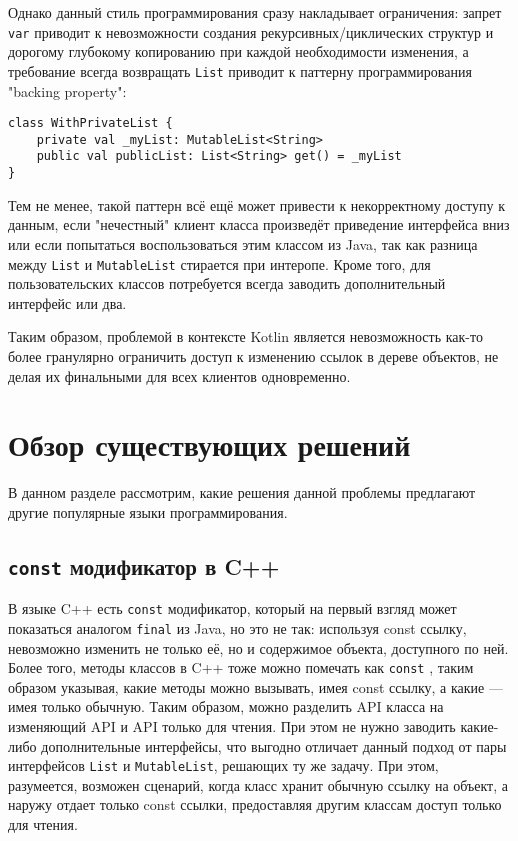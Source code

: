 \documentclass[specification,annotation,times]{itmo-student-thesis}
\begin{document}
Однако данный стиль программирования сразу накладывает ограничения: запрет \texttt{var} приводит к невозможности создания рекурсивных/циклических структур и дорогому глубокому копированию при каждой необходимости изменения, а требование всегда возвращать \texttt{List} приводит к паттерну программирования "backing property":

\begin{lstlisting}[float=h!,caption={Backing property},label={backing_property}]
class WithPrivateList {
	private val _myList: MutableList<String>
	public val publicList: List<String> get() = _myList
}
\end{lstlisting}

Тем не менее, такой паттерн всё ещё может привести к некорректному доступу к данным, если "нечестный" клиент класса произведёт приведение интерфейса вниз или если попытаться воспользоваться этим классом из Java, так как разница между \texttt{List} и \texttt{MutableList} стирается при интеропе.
Кроме того, для пользовательских классов потребуется всегда заводить дополнительный интерфейс или два.

Таким образом, проблемой в контексте Kotlin является невозможность как-то более гранулярно ограничить доступ к изменению ссылок в дереве объектов, не 
делая их финальными для всех клиентов одновременно.

\section{Обзор существующих решений}

В данном разделе рассмотрим, какие решения данной проблемы предлагают другие популярные языки программирования.

\subsection{\texttt{const} модификатор в C++}

В языке C++ есть \texttt{const} модификатор, который на первый взгляд может показаться аналогом \texttt{final} из Java, но это не так: используя const ссылку, невозможно изменить не только её, но и содержимое объекта, доступного по ней. Более того, методы классов в C++ тоже можно помечать как \texttt{const} \cite{cpp-const}, таким образом указывая, какие методы можно вызывать, имея const ссылку, а какие --- имея только обычную.
Таким образом, можно разделить API класса на изменяющий API и API только для чтения. При этом не нужно заводить какие-либо дополнительные интерфейсы, что выгодно отличает данный подход от пары интерфейсов \texttt{List} и \texttt{MutableList}, решающих ту же задачу.
При этом, разумеется, возможен сценарий, когда класс хранит обычную ссылку на объект, а наружу отдает только const ссылки, предоставляя другим классам доступ только для чтения.
\end{document}
